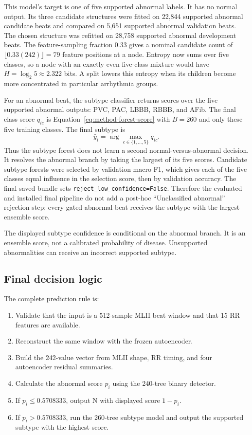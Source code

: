 This model's target is one of five supported abnormal labels. It has no
normal output. Its three candidate structures were fitted on 22,844
supported abnormal candidate beats and compared on 5,651 supported abnormal
validation beats. The chosen structure was refitted on 28,758 supported
abnormal development beats. The feature-sampling fraction 0.33 gives a nominal candidate count of
$\lfloor0.33(242)\rfloor=79$ feature positions at a node. Entropy now sums
over five classes, so a node with an exactly even five-class mixture would
have $H=\log_2 5\approx2.322$ bits. A split lowers this entropy when its
children become more concentrated in particular arrhythmia groups.

For an abnormal beat, the subtype classifier returns scores over the
five supported abnormal outputs: PVC, PAC, LBBB, RBBB, and AFib. The final
class score $q_{ic}$ is Equation~\ref{eq:method-forest-score} with $B=260$
and only these five training classes. The final subtype is
\begin{equation}
 \widehat y_i=\arg\max_{c\in\{1,\ldots,5\}}q_{ic}.
 \label{eq:final-decision}
\end{equation}
Thus the subtype forest does not learn a second normal-versus-abnormal
decision. It resolves the abnormal branch by taking the largest of its five
scores. Candidate subtype forests were selected by validation macro F1,
which gives each of the five classes equal influence in the selection score,
then by validation accuracy.
The final saved bundle sets \texttt{reject\_low\_confidence=False}. Therefore
the evaluated and installed final pipeline do not add a post-hoc
``Unclassified abnormal'' rejection step; every gated abnormal beat receives
the subtype with the largest ensemble score.

The displayed subtype confidence is conditional on the abnormal branch. It
is an ensemble score, not a calibrated probability of disease. Unsupported
abnormalities can receive an incorrect supported subtype.

\subsection{Final decision logic}

The complete prediction rule is:
\begin{enumerate}
\item Validate that the input is a 512-sample MLII beat window and that 15 RR
features are available.
\item Reconstruct the same window with the frozen autoencoder.
\item Build the 242-value vector from MLII shape, RR timing, and four
autoencoder residual summaries.
\item Calculate the abnormal score $p_i$ using the 240-tree binary detector.
\item If $p_i\leq0.5708333$, output N with displayed score $1-p_i$.
\item If $p_i>0.5708333$, run the 260-tree subtype model and output the
supported subtype with the highest score.
\end{enumerate}

